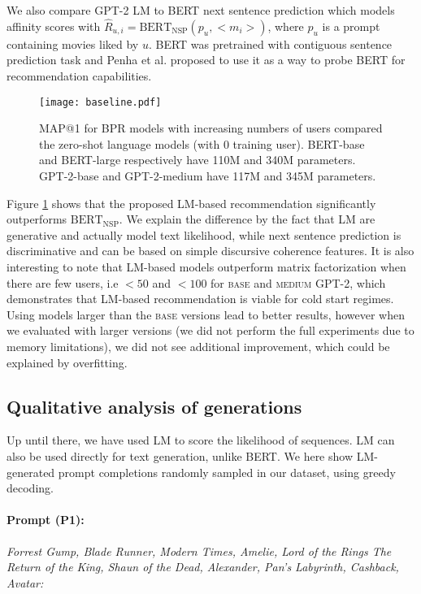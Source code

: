 \documentclass[runningheads]{llncs}
\begin{document}
We also compare GPT-2 LM to BERT next sentence prediction \cite{Penha20} which models affinity scores with $\widehat{R}_{u,i}=\text{BERT}_{\text{NSP}}(p_u, {<}m_i{>})$, where $p_u$ is a prompt containing movies liked by $u$.
BERT was pretrained with contiguous sentence prediction task \cite{devlin-etal-2019-bert} and Penha et al. \cite{Penha20} proposed to use it as a way to probe BERT for recommendation capabilities.

\begin{figure}\centering
    \texttt{[image: baseline.pdf]}
    \caption{MAP@1 for BPR models with increasing numbers of users compared the zero-shot language models (with 0 training user). BERT-base and BERT-large respectively have 110M and 340M parameters. GPT-2-base and GPT-2-medium have 117M and 345M parameters. 
    }
    \label{baseline}
\end{figure}

Figure \ref{baseline} shows that the proposed LM-based recommendation significantly outperforms $\text{BERT}_{\text{NSP}}$. We explain the difference by the fact that LM are generative and actually model text likelihood, while next sentence prediction is discriminative and can be based on simple discursive coherence features.
It is also interesting to note that LM-based models outperform matrix factorization when there are few users, i.e $<50$ and $<100$ for \textsc{base} and \textsc{medium} GPT-2, which demonstrates that LM-based recommendation is viable for cold start regimes. Using models larger than the \textsc{base} versions lead to better results, however when we evaluated with larger versions (we did not perform the full experiments due to memory limitations), we did not see additional improvement, which could be explained by overfitting.

\subsection{Qualitative analysis of generations}
 \vspace{-0.1cm}

Up until there, we have used LM to score the likelihood of sequences. LM can also be used directly for text generation, unlike BERT. We here show LM-generated prompt completions randomly sampled in our dataset, using greedy decoding.

\paragraph{\textbf{Prompt (P1):}}
\textit{Forrest Gump, Blade Runner, Modern Times, Amelie, Lord of the Rings The Return of the King, Shaun of the Dead, Alexander, Pan's Labyrinth, Cashback, Avatar:}
\vspace{-.3cm}
\end{document}
